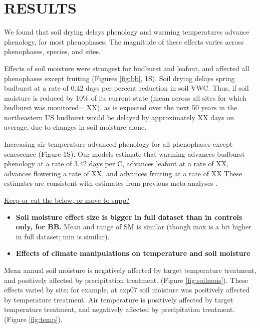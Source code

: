 \documentclass{article}
\begin{document}
\section* {RESULTS}

We found that soil drying delays phenology and warming temperatures advance phenology, for most phenophases. The magnitude of these effects varies across phenophases, species, and sites. 
\par Effects of soil moisture were strongest for budburst and leafout, and affected all phenophases except fruiting (Figures \ref{fig:bb}, 1S). Soil drying delays spring budburst at a rate of 0.42 days per percent reduction in soil VWC. Thus, if soil moisture is reduced by 10\% of its current state (mean across all sites for which budburst was monitored= XX), as is expected over the next 50 years in the northeastern US \citep{berg2017} budburst would be delayed by approximately XX days on average, due to changes in soil moisture alone.

\par  Increasing air temperature advanced phenology for all phenophases except senescence (Figure 1S). Our models estimate that warming advances budburst phenology at a rate of 3.42 days per \degree C, advances leafout at a rate of XX, advances flowering a rate of XX, and advances fruiting at a rate of XX These estimates are consistent with estimates from previous meta-analyses \citep{wolkovich2012}. 

\par \underline{Keep or cut the below, or move to supp?}%
\begin{itemize}
\item \textbf{Soil moisture effect size is bigger in full dataset than in controls only, for BB.} Mean and range of SM is similar (though max is a bit higher in full dataset; min is similar).
\item \textbf{Effects of climate manipulations on temperature and soil moisture}
\end{itemize}
\par Mean annual soil moisture is negatively affected by target temperature treatment, and positively affected by precipitation treatment. (Figure \ref {fig:soilmois}). These effects varied by site; for example, at exp07 soil moisture was positively affected by temperature treatment. Air temperature is positively affected by target temperature treatment, and negatively affected by precipitation treatment. (Figure \ref {fig:temp}).
\end{document}
